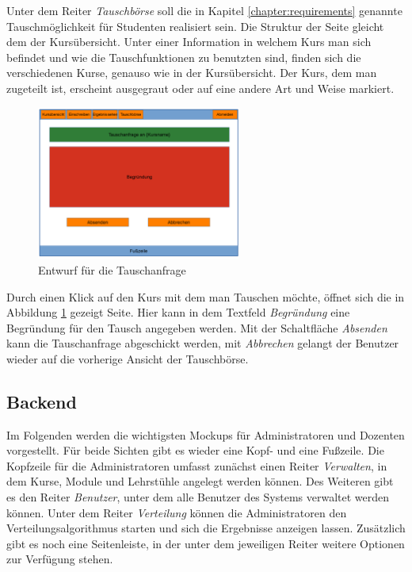             Unter dem Reiter \textit{Tauschbörse} soll die in Kapitel \ref{chapter:requirements} genannte Tauschmöglichkeit für Studenten realisiert sein.
            Die Struktur der Seite gleicht dem der Kursübersicht.
            Unter einer Information in welchem Kurs man sich befindet und wie die Tauschfunktionen zu benutzten sind, finden sich die verschiedenen Kurse, genauso wie in der Kursübersicht.
            Der Kurs, dem man zugeteilt ist, erscheint ausgegraut oder auf eine andere Art und Weise markiert.
            
            \begin{figure}[t]
            	\centering
            	\includegraphics[width=0.6\textwidth]{./design/images/MockUpsFrontend/frontendSwap2.png}
            	\caption{Entwurf für die Tauschanfrage}
            	\label{fig:mockupResultsSwap2}
            \end{figure}
            
            Durch einen Klick auf den Kurs mit dem man Tauschen möchte, öffnet sich die in Abbildung \ref{fig:mockupResultsSwap2} gezeigt Seite.
            Hier kann in dem Textfeld \textit{Begründung} eine Begründung für den Tausch angegeben werden.
            Mit der Schaltfläche \textit{Absenden} kann die Tauschanfrage abgeschickt werden, mit \textit{Abbrechen} gelangt der Benutzer wieder auf die vorherige Ansicht der Tauschbörse.
            
                
            
    
        \subsection{Backend}
	        Im Folgenden werden die wichtigsten Mockups für Administratoren und Dozenten vorgestellt.
	        Für beide Sichten gibt es wieder eine Kopf- und eine Fußzeile.
	        Die Kopfzeile für die Administratoren umfasst zunächst einen Reiter \textit{Verwalten}, in dem Kurse, Module und Lehrstühle angelegt werden können.
	        Des Weiteren gibt es den Reiter \textit{Benutzer}, unter dem alle Benutzer des Systems verwaltet werden können.
	        Unter dem Reiter \textit{Verteilung} können die Administratoren den Verteilungsalgorithmus starten und sich die Ergebnisse anzeigen lassen.
	        Zusätzlich gibt es noch eine Seitenleiste, in der unter dem jeweiligen Reiter weitere Optionen zur Verfügung stehen.
        	

